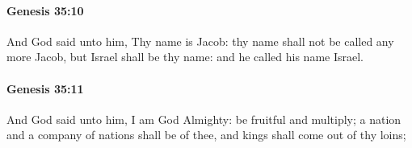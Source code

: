 		\paragraph{Genesis 35:10} %
			\label{GENESIS-35-10}

			And God said unto him, Thy name is Jacob: thy name shall not be called any more Jacob, but Israel shall be thy name: and he called his name Israel.


		\paragraph{Genesis 35:11} %
			\label{GENESIS-35-11}

			And God said unto him, I am God Almighty: be fruitful and multiply; a nation and a company of nations shall be of thee, and kings shall come out of thy loins;


